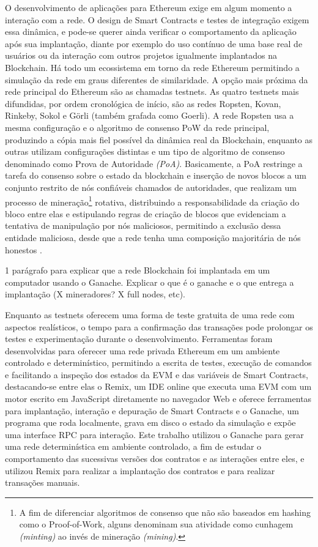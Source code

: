 \documentclass[a4paper,11pt]{article}
\begin{document}
O desenvolvimento de aplicações para Ethereum exige em algum momento a interação com a rede.
O design de Smart Contracts e testes de integração exigem essa dinâmica, e pode-se querer ainda verificar o comportamento da aplicação após sua implantação, diante por exemplo do uso contínuo de uma base real de usuários ou da interação com outros projetos igualmente implantados na Blockchain.
Há todo um ecossistema em torno da rede Ethereum permitindo a simulação da rede em graus diferentes de similaridade.
A opção mais próxima da rede principal do Ethereum são as chamadas testnets.
As quatro testnets mais difundidas, por ordem cronológica de início, são as redes Ropsten, Kovan, Rinkeby, Sokol e Görli (também grafada como Goerli).
A rede Ropsten usa a mesma configuração e o algoritmo de consenso PoW da rede principal, produzindo a cópia mais fiel possível da dinâmica real da Blockchain, enquanto as outras utilizam configurações distintas e um tipo de algoritmo de consenso denominado como Prova de Autoridade \emph{(PoA)}.
Basicamente, a PoA restringe a tarefa do consenso sobre o estado da blockchain e inserção de novos blocos a um conjunto restrito de nós confiáveis chamados de autoridades, que realizam um processo de mineração\footnote{A fim de diferenciar algoritmos de consenso que não são baseados em hashing como o Proof-of-Work, alguns denominam sua atividade como cunhagem \emph{(minting)} ao invés de mineração \emph{(mining)}.} rotativa, distribuindo a responsabilidade da criação do bloco entre elas e estipulando regras de criação de blocos que evidenciam a tentativa de manipulação por nós maliciosos, permitindo a exclusão dessa entidade maliciosa, desde que a rede tenha uma composição majoritária de nós honestos \cite{DeAngelis2018}.

{\color{Magenta} 1 parágrafo para explicar que a rede Blockchain foi implantada em um computador usando o Ganache. Explicar o que é o ganache e o que entrega a implantação (X mineradores? X full nodes, etc).}

Enquanto as testnets oferecem uma forma de teste gratuita de uma rede com aspectos realísticos, o tempo para a confirmação das transações pode prolongar os testes e experimentação durante o desenvolvimento.
Ferramentas foram desenvolvidas para oferecer uma rede privada Ethereum em um ambiente controlado e determinístico, permitindo a escrita de testes, execução de comandos e facilitando a inspeção dos estados da EVM e das variáveis de Smart Contracts, destacando-se entre elas o Remix, um IDE online que executa uma EVM com um motor escrito em JavaScript diretamente no navegador Web e oferece ferramentas para implantação, interação e depuração de Smart Contracts e o Ganache, um programa que roda localmente, grava em disco o estado da simulação e expõe uma interface RPC para interação.
Este trabalho utilizou o Ganache para gerar uma rede determinística em ambiente controlado, a fim de estudar o comportamento das sucessivas versões dos contratos e as interações entre eles, e utilizou Remix para realizar a implantação dos contratos e para realizar transações manuais.
\end{document}
